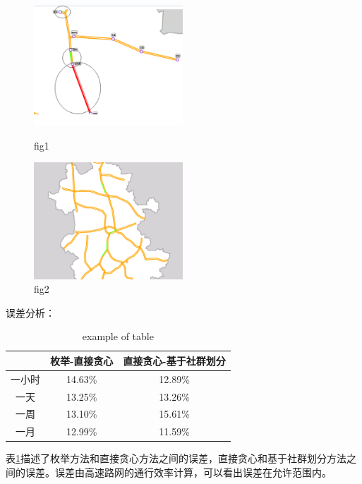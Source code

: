 				\begin{figure}
				\begin{minipage}{0.5\linewidth}
					\centering
					\includegraphics[width=2.2in]{picture/shequnhuafen}
					\caption{fig1}
					\label{jihe3}
				\end{minipage}%
				\begin{minipage}{0.5\linewidth}
					\centering
					\includegraphics[width=2.2in]{picture/hotsection01}
					\caption{fig2}
					\label{jihe4}
				\end{minipage}
				\end{figure}

		误差分析：

				\begin{table}[h]
				\centering
				\begin{tabular}{|c|c|c|}
				\hline
				\hline
				  &  枚举-直接贪心 &  直接贪心-基于社群划分 \\
				\hline
				 一小时 &  14.63\% &  12.89\% \\
				\hline
				 一天 &  13.25\% &  13.26\% \\
				\hline
				 一周 &  13.10\% &  15.61\% \\
				\hline
				 一月 &  12.99\% &  11.59\% \\
				\hline
				\end{tabular}
				\caption{example of table}
				\label{table1}
				\end{table} 

		表\ref{table1}描述了枚举方法和直接贪心方法之间的误差，直接贪心和基于社群划分方法之间的误差。误差由高速路网的通行效率计算，可以看出误差在允许范围内。

